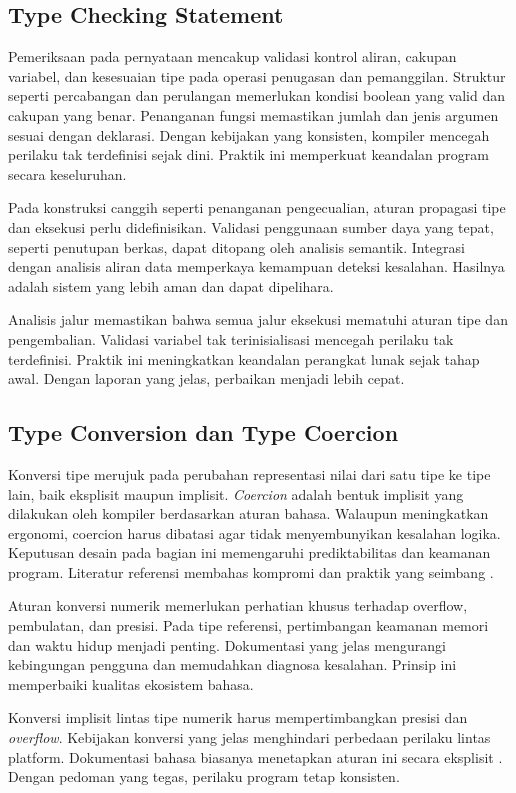 \documentclass[../main.tex]{subfiles}
\begin{document}
\subsection{Type Checking Statement}
Pemeriksaan pada pernyataan mencakup validasi kontrol aliran, cakupan variabel, dan kesesuaian tipe pada operasi penugasan dan pemanggilan. Struktur seperti percabangan dan perulangan memerlukan kondisi boolean yang valid dan cakupan yang benar. Penanganan fungsi memastikan jumlah dan jenis argumen sesuai dengan deklarasi. Dengan kebijakan yang konsisten, kompiler mencegah perilaku tak terdefinisi sejak dini. Praktik ini memperkuat keandalan program secara keseluruhan.

Pada konstruksi canggih seperti penanganan pengecualian, aturan propagasi tipe dan eksekusi perlu didefinisikan. Validasi penggunaan sumber daya yang tepat, seperti penutupan berkas, dapat ditopang oleh analisis semantik. Integrasi dengan analisis aliran data memperkaya kemampuan deteksi kesalahan. Hasilnya adalah sistem yang lebih aman dan dapat dipelihara.

Analisis jalur memastikan bahwa semua jalur eksekusi mematuhi aturan tipe dan pengembalian. Validasi variabel tak terinisialisasi mencegah perilaku tak terdefinisi. Praktik ini meningkatkan keandalan perangkat lunak sejak tahap awal. Dengan laporan yang jelas, perbaikan menjadi lebih cepat.

\subsection{Type Conversion dan Type Coercion}
Konversi tipe merujuk pada perubahan representasi nilai dari satu tipe ke tipe lain, baik eksplisit maupun implisit. \emph{Coercion} adalah bentuk implisit yang dilakukan oleh kompiler berdasarkan aturan bahasa. Walaupun meningkatkan ergonomi, coercion harus dibatasi agar tidak menyembunyikan kesalahan logika. Keputusan desain pada bagian ini memengaruhi prediktabilitas dan keamanan program. Literatur referensi membahas kompromi dan praktik yang seimbang \citep{WikiCoercion}.

Aturan konversi numerik memerlukan perhatian khusus terhadap overflow, pembulatan, dan presisi. Pada tipe referensi, pertimbangan keamanan memori dan waktu hidup menjadi penting. Dokumentasi yang jelas mengurangi kebingungan pengguna dan memudahkan diagnosa kesalahan. Prinsip ini memperbaiki kualitas ekosistem bahasa.

Konversi implisit lintas tipe numerik harus mempertimbangkan presisi dan \emph{overflow}. Kebijakan konversi yang jelas menghindari perbedaan perilaku lintas platform. Dokumentasi bahasa biasanya menetapkan aturan ini secara eksplisit \citep{WikiCoercion}. Dengan pedoman yang tegas, perilaku program tetap konsisten.
\end{document}
